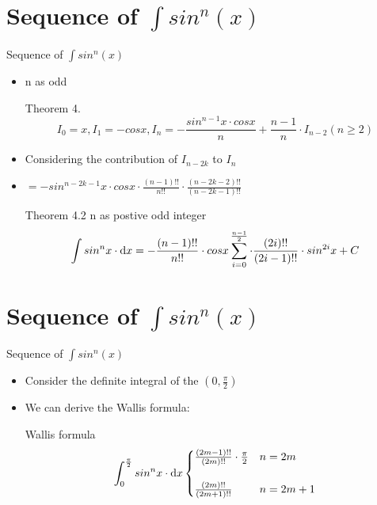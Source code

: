 \documentclass[11pt, thmnum, eqsecnum, allcites, dark]{mathbeamer}
\begin{document}
\section{Sequence of $\int sin^n(x)$}
\begin{frame}{Sequence of $\int sin^n(x)$}
\begin{itemize}[<+->]
\item n as odd
  \begin{block}{Theorem 4.}
 $$I_0 = x, I_1 = -cosx, I_n = -\frac{sin^{n-1}x \cdot cosx}{n} + \frac{n-1}{n} \cdot I_{n-2} (n \geq 2)$$
  \end{block}
\item Considering the contribution of $I_{n-2k}$ to $I_n$
\item $=-sin^{n-2k-1}x \cdot cosx \cdot \frac{(n-1)!!}{n!!} \cdot \frac{(n-2k-2)!!}{(n-2k-1)!!}$
  \begin{block}{Theorem 4.2}
n as postive odd integer
  $$\int sin^nx \cdot {\rm d}x = -\frac{(n-1)!!}{n!!} \cdot cosx \sum_{i=0}^{\frac{n-1}{2}} \cdot \frac{(2i)!!}{(2i-1)!!} \cdot sin^{2i}x + C$$
  \end{block}
\end{itemize}
\end{frame}

\section{Sequence of $\int sin^n(x)$}
\begin{frame}{Sequence of $\int sin^n(x)$}
\begin{itemize}[<+->]
  \begin{block}{Theorem 4.1,4.2}
n as postive even integer
 $\int sin^nx \cdot {\rm d}x = \frac{(n-1)!!}{n!!} \cdot [x - cosx \sum_{i=0}^{\frac{n}{2}-1} \cdot \frac{(2i)!!}{(2i+1)!!} \cdot sin^{2i+1}x] + C$
n as postive odd integer
 $\int sin^nx \cdot {\rm d}x = -\frac{(n-1)!!}{n!!} \cdot cosx \sum_{i=0}^{\frac{n-1}{2}} \cdot \frac{(2i)!!}{(2i-1)!!} \cdot sin^{2i}x + C$
  \end{block}
\item Consider the definite integral of the $(0,\frac{\pi}{2})$
\item We can derive the Wallis formula:
  \begin{block}{Wallis formula}
$$\int_{0}^{\frac{\pi}{2}} sin^nx \cdot {\rm d}x
\begin{cases}
\frac{(2m-1)!!}{(2m)!!} \cdot \frac{\pi}{2} & n=2m\\\\
\frac{(2m)!!}{(2m+1)!!}& n=2m+1
\end{cases}$$
  \end{block}
\end{itemize}
\end{frame}
\end{document}

